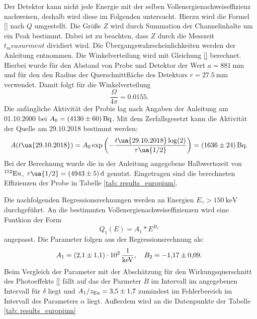 \FloatBarrier
Der Detektor kann nicht jede Energie mit der selben Vollenergienachweiseffizienz
nachweisen, deshalb wird diese im Folgenden untersucht. Hierzu wird die Formel
\eqref{} nach $Q$ umgestellt. Die Größe $Z$ wird durch Summation der Channelinhalte
um ein Peak bestimmt. Dabei ist zu beachten, dass $Z$ durch die Messzeit $t_measurment$
dividiert wird. Die Übergangswahrscheinlichkeiten werden der Anleitung \cite{anleitungV18}
entnommen. Die Winkelverteilung wird mit Gleichung \eqref{} berechnet. Hierbei wurde
für den Abstand von Probe und Detektor der Wert $a=\SI{881}{\milli\meter}$ und für den
den Radius der Querschnittfläche des Detektors $r=\SI{27.5}{\milli\meter}$
verwendet. Damit folgt für die Winkelverteilung
\begin{equation}
  \label{eq:winkelverteilung}
  \frac{\Omega}{4\pi}=\num{0.0155}.
\end{equation}
Die anfängliche Aktivität der Probie lag nach Angaben der Anleitung \cite{anleitungV18}
am 01.10.2000 bei $A_0=\SI{4130\pm60}{\becquerel}$. Mit dem Zerfallsgesetzt kann die
Aktivität der Quelle am 29.10.2018 bestimmt werden:
\begin{equation}
  A(t\ua{29.10.2018})=A_0\exp\left(-\frac{t\ua{29.10.2018}\log(2)}{\tau\ua{1/2}}\right) = \SI{1636\pm24}{\becquerel}.
\end{equation}
Bei der Berechnung wurde die in der Anleitung \cite{anleitungV18} angegebene
Halbwertszeit von $^{152}\ce{Eu}$, $\tau\ua{1/2}=\SI{4943 \pm 5 }{\day}$ genutzt.
Eingetragen sind die berechneten Effizienzen der Probe in Tabelle \ref{tab: results_europium}.

Die nachfolgenden Regressionsrechnungen werden an Energien $E_\gamma>\SI{150}{\kilo\eV}$
durchgeführt.
An die bestimmten Vollenergienachweiseffizienzen wird eine Funtkion der Form
\begin{equation*}
  Q_1(E)=A_1*E^{B_1}
\end{equation*}
angepasst. Die Parameter folgen aus der Regressionsrechnung als:
\begin{equation}
\label{eq:effizienz_Q_1}
A_1 = \SI{2.1\pm1.1 e2}{\per\kilo\eV}, \quad B_2=\num{-1.17\pm 0.09}.
\end{equation}
Beim Vergleich der Parameter mit der Abschätzung für den Wirkungsquerschnitt
des Photoeffekts \eqref{} fällt auf das der Parmeter $B$ im Intervall im angegebenen
Intervall für $\delta$ liegt und $A_1/z_{\ce{Eu}}=\num{3.5\pm1.7}$ zumindest im
Fehlerbereich im Intervall des Parameters $\alpha$ liegt.
Außerdem wird an die Datenpunkte der Tabelle \ref{tab: results_europium}
